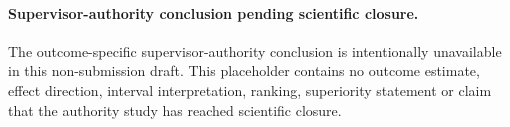 \paragraph{Supervisor-authority conclusion pending scientific closure.}
The outcome-specific supervisor-authority conclusion is intentionally unavailable
in this non-submission draft. This placeholder contains no outcome estimate,
effect direction, interval interpretation, ranking, superiority statement or
claim that the authority study has reached scientific closure.
